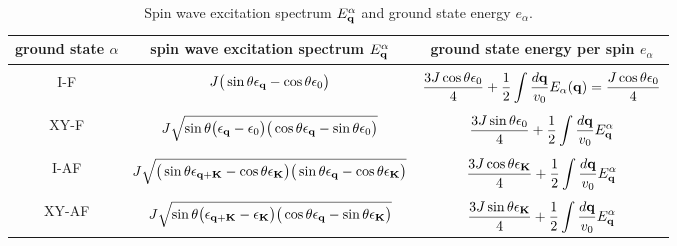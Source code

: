 \begin{table*}[t]
\begin{tabular}{c c  c}
\toprule
 ground state $\alpha$&  \hspace{30pt}  spin wave excitation spectrum $E^{\alpha}_{\bf q}$   \hspace{30pt} & \hspace{20pt} ground state energy per spin $e_{\alpha}$ \hspace{20pt} \\
 \hline
 \\
I-F& $J \big(\sin \theta  \epsilon_{\bf q} - \cos \theta  \epsilon_{0}\big) $&    $\displaystyle   \frac{3 J \cos \theta \epsilon_{0}}{4}  +\frac{1}{2}  \int \frac{d{\bf q}}{v_0} E_{\alpha}({\bf q})=\frac{J  \cos \theta \epsilon_{0}}{4}$\\
 \\
 XY-F & $    J\sqrt{ \sin\theta \big(\epsilon_{\bf q}-\epsilon_{0}\big)\big( \cos\theta \epsilon_{\bf q}- \sin \theta \epsilon_{0}\big)}$
&$\displaystyle   \frac{3 J \sin \theta \epsilon_{0} }{4}  +\frac{1}{2}  \int \frac{d{\bf q}}{v_0} E^{\alpha}_{\bf q}$\\
\\
 I-AF &  $ J  \sqrt{\big( \sin \theta \epsilon_{{\bf q}+{\bf K}}-\cos \theta \epsilon_{\bf K}\big) \big(\sin \theta \epsilon_{\bf q}- \cos \theta \epsilon_{\bf K }\big)}$
 &$ \displaystyle \frac{3  J \cos \theta \epsilon_{\bf K} }{4}  +\frac{1}{2}  \int \frac{d{\bf q}}{v_0} E^{\alpha}_{\bf q}$\\
 \\
 XY-AF& $  J  \sqrt{\sin \theta \big(  \epsilon_{{\bf q}+{\bf K}}-\epsilon_{\bf K} \big)\big( \cos \theta \epsilon_{\bf q}-\sin \theta \epsilon_{\bf K}\big)}$&
 $\displaystyle \frac{3 J \sin \theta \epsilon_{\bf K} }{4} + \frac{1}{2}  \int \frac{d{\bf q}}{v_0} E^{\alpha}_{\bf q}$\\
\end{tabular}
\caption{ \label{table1} Spin wave excitation spectrum $E_{\bf q}^{\alpha}$ and ground state energy  $e_{\alpha}$.}
\end{table*}



